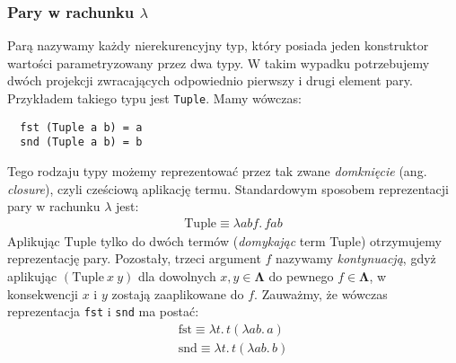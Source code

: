 \subsubsection{Pary w rachunku \(\lambda\)}
Parą nazywamy każdy nierekurencyjny typ, który posiada jeden konstruktor wartości parametryzowany przez dwa typy. W takim wypadku potrzebujemy dwóch projekcji zwracających odpowiednio pierwszy i drugi element pary. Przykładem takiego typu jest \texttt{Tuple}. Mamy wówczas:
\begin{verbatim}
  fst (Tuple a b) = a
  snd (Tuple a b) = b
\end{verbatim}
Tego rodzaju typy możemy reprezentować przez tak zwane \emph{domknięcie} (ang. \emph{closure}), czyli cześciową aplikację termu. Standardowym sposobem reprezentacji pary w rachunku \(\lambda\) jest:
\begin{align*}
  \mathrm{Tuple}\equiv\lambda a b f .\,f a b
\end{align*}
Aplikując \(\mathrm{Tuple}\) tylko do dwóch termów (\emph{domykając} term Tuple) otrzymujemy reprezentację pary. Pozostały, trzeci argument \(f\) nazywamy \emph{kontynuacją}, gdyż aplikując \((\mathrm{Tuple}\ x\ y)\) dla dowolnych \(x, y\in\mathbf{\Lambda}\) do pewnego \(f\in\mathbf{\Lambda}\), w konsekwencji \(x\) i \(y\) zostają zaaplikowane do \(f\).
Zauważmy, że wówczas reprezentacja \texttt{fst} i \texttt{snd} ma postać:
\begin{align*}
  \mathrm{fst} \equiv \lambda t.\,t(\lambda a b.\,a) \\
  \mathrm{snd} \equiv \lambda t.\,t(\lambda a b.\,b)
\end{align*}

